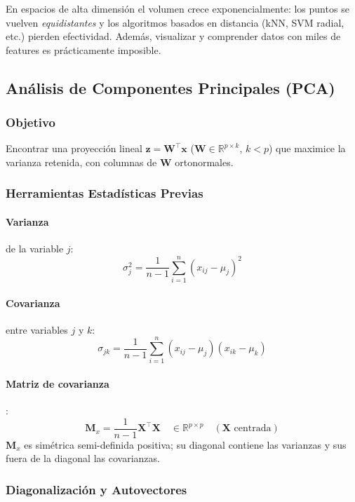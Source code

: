 \documentclass[12pt, a4paper]{article}
\newcommand{\R}{\mathbb{R}}
\begin{document}
\begin{notebox}
	En espacios de alta dimensión el volumen crece exponencialmente: los puntos se vuelven
	\emph{equidistantes} y los algoritmos basados en distancia (kNN, SVM radial, etc.)
	pierden efectividad. Además, visualizar y comprender datos con miles de features es
	prácticamente imposible.
\end{notebox}

\subsection{Análisis de Componentes Principales (PCA)}

\subsubsection{Objetivo}
Encontrar una proyección lineal $\mathbf{z} = \mathbf{W}^\top \mathbf{x}$
($\mathbf{W} \in \R^{p\times k}$, $k < p$) que maximice la varianza retenida,
con columnas de $\mathbf{W}$ ortonormales.

\subsubsection{Herramientas Estadísticas Previas}

\paragraph{Varianza} de la variable $j$:
\[
	\sigma_j^2 = \frac{1}{n-1}\sum_{i=1}^n (x_{ij} - \mu_j)^2
\]

\paragraph{Covarianza} entre variables $j$ y $k$:
\[
	\sigma_{jk} = \frac{1}{n-1}\sum_{i=1}^n (x_{ij}-\mu_j)(x_{ik}-\mu_k)
\]

\paragraph{Matriz de covarianza}:
\[
	\mathbf{M}_x = \frac{1}{n-1}\mathbf{X}^\top\mathbf{X}
	\quad\in\R^{p\times p} \quad (\mathbf{X} \text{ centrada})
\]
$\mathbf{M}_x$ es simétrica semi-definida positiva; su diagonal contiene las varianzas
y sus fuera de la diagonal las covarianzas.

\subsubsection{Diagonalización y Autovectores}
\end{document}
